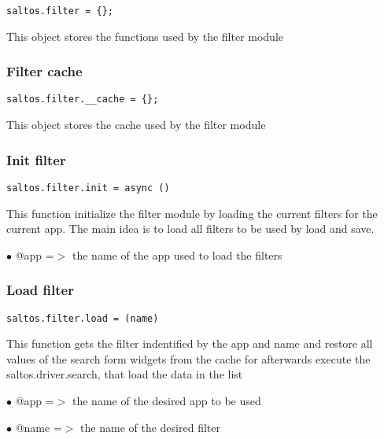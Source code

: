 \documentclass[a4paper]{article}
\begin{document}
\begin{lstlisting}
saltos.filter = {};
\end{lstlisting}

This object stores the functions used by the filter module

\hypertarget{toc766}{}
\subsubsection{Filter cache}

\begin{lstlisting}
saltos.filter.__cache = {};
\end{lstlisting}

This object stores the cache used by the filter module

\hypertarget{toc767}{}
\subsubsection{Init filter}

\begin{lstlisting}
saltos.filter.init = async ()
\end{lstlisting}

This function initialize the filter module by loading the current filters for
the current app. The main idea is to load all filters to be used by load and
save.

\begin{compactitem}
\item[\color{myblue}$\bullet$] @app =$>$ the name of the app used to load the filters
\end{compactitem}

\hypertarget{toc768}{}
\subsubsection{Load filter}

\begin{lstlisting}
saltos.filter.load = (name)
\end{lstlisting}

This function gets the filter indentified by the app and name and restore
all values of the search form widgets from the cache for afterwards execute
the saltos.driver.search, that load the data in the list

\begin{compactitem}
\item[\color{myblue}$\bullet$] @app  =$>$ the name of the desired app to be used
\item[\color{myblue}$\bullet$] @name =$>$ the name of the desired filter
\end{compactitem}
\end{document}
